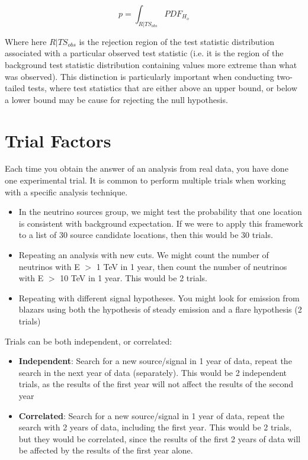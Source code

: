 \begin{equation}
    p = \int_{R|TS_{obs}} PDF_{H_o}
\label{peq_general}    
\end{equation}

Where here $R|TS_{obs}$ is the rejection region of the test statistic distribution associated with a particular observed test statistic (i.e. it is the region of the background test statistic distribution containing values more extreme than what was observed). This distinction is particularly important when conducting two-tailed tests, where test statistics that are either above an upper bound, or below a lower bound may be cause for rejecting the null hypothesis. 

\section{Trial Factors}
Each time you obtain the answer of an analysis from real data, you have done one experimental trial. It is common to perform multiple trials when working with a specific analysis technique.

\begin{itemize}
    \item In the neutrino sources group, we might test the probability that one location is consistent with background expectation. If we were to apply this framework to a list of 30 source candidate locations, then this would be 30 trials.
    \item Repeating an analysis with new cuts. We might count the number of neutrinos with E $>$ 1 TeV in 1 year, then count the number of neutrinos with E $>$ 10 TeV in 1 year. This would be 2 trials. 
    \item Repeating with different signal hypotheses. You might look for emission from blazars using both the hypothesis of steady emission and a flare hypothesis (2 trials)
\end{itemize}
Trials can be both independent, or correlated:

\begin{itemize}
    \item \textbf{Independent}: Search for a new source/signal in 1 year of data, repeat the search in the next year of data (separately). This would be 2 independent trials, as the results of the first year will not affect the results of the second year
    \item \textbf{Correlated}: Search for a new source/signal in 1 year of data, repeat the search with 2 years of data, including the first year. This would be 2 trials, but they would be correlated, since the results of the first 2 years of data will be affected by the results of the first year alone. 
\end{itemize}

